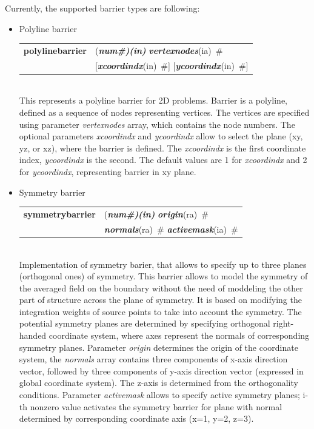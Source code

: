\documentclass[a4paper]{article}
\makeatletter
\newcommand{\param}[1]{{\em #1}}
\newcommand{\fieldVal}[2]{\mbox{({\it\bf{#1}\#)\tiny (#2)}}}
\newcommand{\keywordnotype}[1]{\mbox{{\it{\bf{#1}}}}}
\newcommand{\keyword}[2]{\mbox{{\keywordnotype{#1}\tiny (#2)}}}
\newcommand{\entKeywordInst}[1]{\mbox{{\bf{{#1}}}}}
\newcommand{\field}[2]{\mbox{\keyword{#1}{#2}~\#}}
\newcommand{\optField}[2]{\mbox{[\field{#1}{#2}]}}
\newenvironment{record}[1][]{\begin{tabular}{|ll}}{\end{tabular}\\}
\newcommand{\recentry}[2]{{#1}&{#2}\\}
\newcounter{rcc}
\newenvironment{record}[1][\textwidth]{\setcounter{rcc}{0}\begin{tabular*}{#1}{|ll@{\extracolsep{\fill}}r}}{\end{tabular*}\\}
\newcommand{\recentry}[2]{\ifthenelse{\value{rcc}>0}{&$\backslash$ \\}{\setcounter{rcc}{1}}{#1}&{#2}}
\makeatother
\begin{document}
Currently, the supported barrier types are following:
\begin{itemize}
\item
  Polyline barrier

  \begin{record}[0.9\textwidth]
    \recentry{\entKeywordInst{polylinebarrier}}{\fieldVal{num}{in} \field{vertexnodes}{ia}}
    \recentry{}{\optField{xcoordindx}{in} \optField{ycoordindx}{in}}
  \end{record}
  This represents a polyline barrier for 2D problems. Barrier is a
polyline, defined as a sequence of nodes representing vertices.
The vertices are specified using parameter \param{vertexnodes} array,
which contains the node numbers. The optional parameters
\param{xcoordindx} and \param{ycoordindx} allow to select the plane
(xy, yz, or xz), where the barrier is defined. The \param{xcoordindx} is the
first coordinate index, \param{ycoordindx} is the second. The default values
are 1 for \param{xcoordindx} and 2 for \param{ycoordindx}, representing barrier in xy plane.
\item Symmetry barrier

\begin{record}[0.9\textwidth]
  \recentry{\entKeywordInst{symmetrybarrier}}{\fieldVal{num}{in} \field{origin}{ra}}
  \recentry{}{\field{normals}{ra} \field{activemask}{ia}}
\end{record}
Implementation of symmetry barier, that allows to specify up to three planes (orthogonal ones) of symmetry.
This barrier allows to  model the symmetry of the averaged field on the boundary without 
the need of moddeling the other part of structure across the plane of symmetry.
It is based on  modifying the integration weights of source points to take into account 
the symmetry.
The potential symmetry planes are determined by specifying orthogonal right-handed coordinate system, 
where axes represent the normals of corresponding symmetry planes. 
Parameter \param{origin} determines the origin of the coordinate system, the \param{normals} array 
contains three components of x-axis direction vector, 
followed by three components of y-axis direction vector (expressed in global coordinate system).
The z-axis is determined from the orthogonality conditions.
Parameter \param{activemask} allows to specify active symmetry planes; i-th nonzero value activates the symmetry barrier for plane
with normal determined by corresponding coordinate axis (x=1, y=2, z=3).
\end{itemize}
\end{document}
